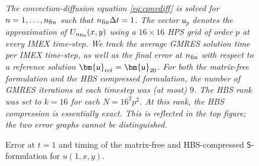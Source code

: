 \documentclass[final,onefignum,onetabnum]{siamart250211}
\newcommand{\vct}[1]{\bm{\mathsf{#1}}}
\newcommand{\mtx}[1]{\bm{\mathsf{#1}}}
\theoremstyle{definition}
\begin{document}
\begin{figure}
\centering
\begin{minipage}[t]{0.55\textwidth}
\centering
\vspace{0pt}
\datatableConvDiff
{}
\end{minipage}
\hfill
\begin{minipage}[t]{0.38\textwidth}
\small
\vspace{10pt}
\textit{The convection-diffusion equation \eqref{eq:convdiff} is solved for $n=1,\ldots,n_{\rm fin}$ such that $n_{\rm fin}\Delta t = 1$. The vector $\vct{u}_p$ denotes the approximation of $U_{n_{\rm fin}}(x,y)$ using a $16\times 16$ HPS grid of order $p$ at every IMEX time-step. We track the average GMRES solution time per IMEX time-step, as well as the final error at $n_{\rm fin}$ with respect to a reference solution $\vct{u}_{\rm ref}=\vct{u}_{20}$. For both the matrix-free formulation and the HBS compressed formulation, the number of GMRES iterations at each timestep was (at most) $9$. The HBS rank was set to $k=16$ for each $N=16^2p^2$. At this rank, the HBS compression is essentially exact. This is reflected in the top figure; the two error graphs cannot be distinguished.}
\end{minipage}
\caption{Error at $t=1$ and timing of the matrix-free and HBS-compressed $\mtx{S}$-formulation for $u(1,x,y)$.}
\label{fig:convdiff_comparison}
\end{figure}
\end{document}
